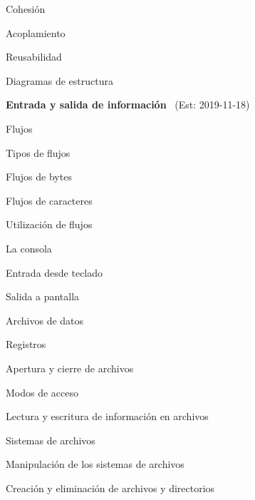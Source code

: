 \begin{longenum}
\begin{longenum}
\begin{longenum}
\begin{longenum}
                \item Cohesión
                \item Acoplamiento
            \end{longenum}
            \item Reusabilidad
        \end{longenum}
        \item Diagramas de estructura
    \end{longenum}
    \item \textbf{Entrada y salida de información} \ (Est: 2019-11-18)
    \begin{longenum}
        \item Flujos
        \begin{longenum}
            \item Tipos de flujos
            \begin{longenum}
                \item Flujos de bytes
                \item Flujos de caracteres
            \end{longenum}
            \item Utilización de flujos
        \end{longenum}
        \item La consola
        \begin{longenum}
            \item Entrada desde teclado
            \item Salida a pantalla
        \end{longenum}
        \item Archivos de datos
        \begin{longenum}
            \item Registros
            \item Apertura y cierre de archivos
            \item Modos de acceso
            \item Lectura y escritura de información en archivos
        \end{longenum}
        \item Sistemas de archivos
        \begin{longenum}
            \item Manipulación de los sistemas de archivos
            \item Creación y eliminación de archivos y directorios
        \end{longenum}
    \end{longenum}

\end{longenum}
